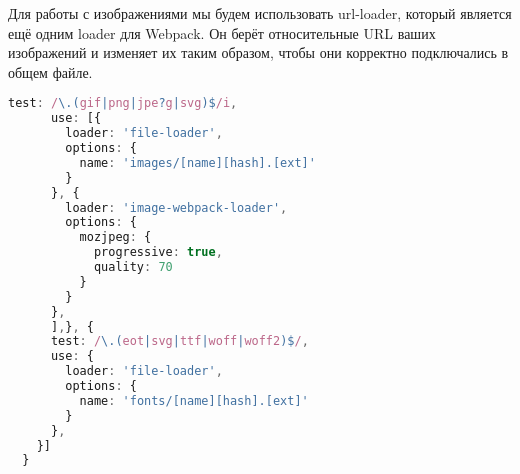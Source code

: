 Для работы с изображениями мы будем использовать url-loader, который является ещё одним loader для Webpack. Он берёт относительные URL 
ваших изображений и изменяет их таким образом, чтобы они корректно подключались в общем файле.
\begin{lstlisting}[language=TypeScript, label=lst:domain:html]
test: /\.(gif|png|jpe?g|svg)$/i,
      use: [{
        loader: 'file-loader',
        options: {
          name: 'images/[name][hash].[ext]'
        }
      }, {
        loader: 'image-webpack-loader',
        options: {
          mozjpeg: {
            progressive: true,
            quality: 70
          }
        }
      },
      ],}, {
      test: /\.(eot|svg|ttf|woff|woff2)$/,
      use: {
        loader: 'file-loader',
        options: {
          name: 'fonts/[name][hash].[ext]'
        }
      },
    }]
  }
\end{lstlisting}
